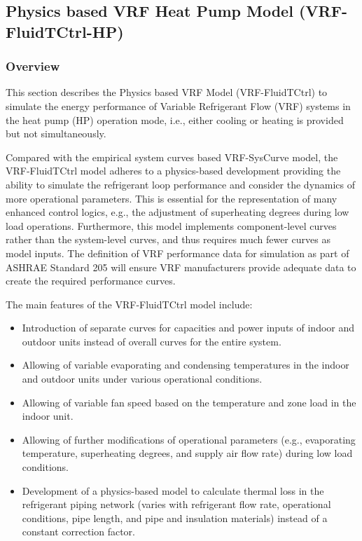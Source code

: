 \subsection{Physics based VRF Heat Pump Model (VRF-FluidTCtrl-HP)}\label{VRF-FluidTCtrl-HP}

\subsubsection{Overview}\label{VRF-FluidTCtrl-HP-overview}

This section describes the Physics based VRF Model (VRF-FluidTCtrl) to simulate the energy performance of Variable Refrigerant Flow (VRF) systems in the heat pump (HP) operation mode, i.e., either cooling or heating is provided but not simultaneously.

Compared with the empirical system curves based VRF-SysCurve model, the VRF-FluidTCtrl model adheres to a physics-based development providing the ability to simulate the refrigerant loop performance and consider the dynamics of more operational parameters. This is essential for the representation of many enhanced control logics, e.g., the adjustment of superheating degrees during low load operations. Furthermore, this model implements component-level curves rather than the system-level curves, and thus requires much fewer curves as model inputs. The definition of VRF performance data for simulation as part of ASHRAE Standard 205 will ensure VRF manufacturers provide adequate data to create the required performance curves.

The main features of the VRF-FluidTCtrl model include:

\begin{itemize}
  \item
   Introduction of separate curves for capacities and power inputs of indoor and outdoor units instead of overall curves for the entire system.
 \item
   Allowing of variable evaporating and condensing temperatures in the indoor and outdoor units under various operational conditions.
\item
  Allowing of variable fan speed based on the temperature and zone load in the indoor unit.
\item
  Allowing of further modifications of operational parameters (e.g., evaporating temperature, superheating degrees, and supply air flow rate) during low load conditions.
\item
  Development of a physics-based model to calculate thermal loss in the refrigerant piping network (varies with refrigerant flow rate, operational conditions, pipe length, and pipe and insulation materials) instead of a constant correction factor.
\end{itemize}

